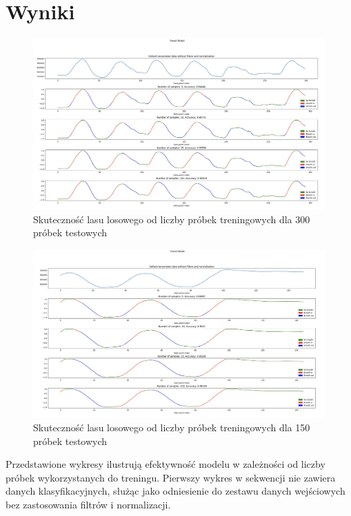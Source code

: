 \documentclass{article}
\begin{document}
\section{Wyniki}

\begin{figure}[H]
    \centering
    \includegraphics[width=\textwidth]{jak_sobie_radzi_las_losowy.png}
    \caption{Skuteczność lasu losowego od liczby próbek treningowych dla 300 próbek testowych}
\end{figure}

\begin{figure}[H]
    \centering
    \includegraphics[width=\textwidth]{jak_sobie_radzi_las_losowy_2.png}
    \caption{Skuteczność lasu losowego od liczby próbek treningowych dla 150 próbek testowych}
\end{figure}

Przedstawione wykresy ilustrują efektywność modelu w zależności od liczby próbek wykorzystanych do treningu. Pierwszy wykres w sekwencji nie zawiera danych klasyfikacyjnych, służąc jako odniesienie do zestawu danych wejściowych bez zastosowania filtrów i normalizacji.
\end{document}
